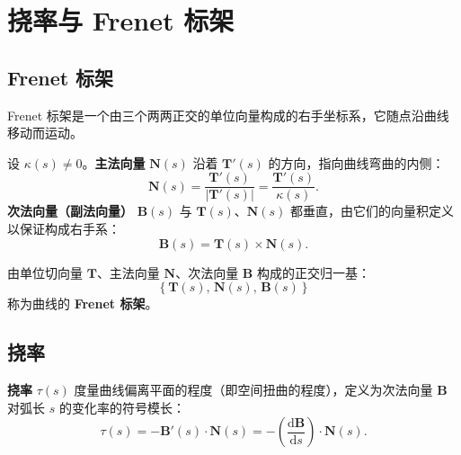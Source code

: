 \section{挠率与 Frenet 标架}

\subsection{Frenet 标架}

Frenet 标架是一个由三个两两正交的单位向量构成的右手坐标系，它随点沿曲线移动而运动。

\begin{definition}[主法向量与次法向量]
	设 $\kappa(s)\neq 0$。\textbf{主法向量} $\mathbf{N}(s)$ 沿着 $\mathbf{T}'(s)$ 的方向，指向曲线弯曲的内侧：
	\begin{equation}
		\mathbf{N}(s)=\frac{\mathbf{T}'(s)}{\left|\mathbf{T}'(s)\right|}
		=\frac{\mathbf{T}'(s)}{\kappa(s)}.
		\label{eq:主法向量:定义}
	\end{equation}
	\textbf{次法向量（副法向量）} $\mathbf{B}(s)$ 与 $\mathbf{T}(s)$、$\mathbf{N}(s)$ 都垂直，由它们的向量积定义以保证构成右手系：
	\begin{equation}
		\mathbf{B}(s)=\mathbf{T}(s)\times\mathbf{N}(s).
		\label{eq:次法向量:定义}
	\end{equation}
\end{definition}

\begin{definition}[Frenet 标架]
	由单位切向量 $\mathbf{T}$、主法向量 $\mathbf{N}$、次法向量 $\mathbf{B}$ 构成的正交归一基：
	\begin{equation}
		\left\{\mathbf{T}(s),\,\mathbf{N}(s),\,\mathbf{B}(s)\right\}
		\label{eq:Frenet标架:定义}
	\end{equation}
	称为曲线的 \textbf{Frenet 标架}。
\end{definition}

\subsection{挠率}

\begin{definition}[挠率]
	\textbf{挠率} $\tau(s)$ 度量曲线偏离平面的程度（即空间扭曲的程度），定义为次法向量 $\mathbf{B}$ 对弧长 $s$ 的变化率的符号模长：
	\begin{equation}
		\tau(s)=-\mathbf{B}'(s)\cdot\mathbf{N}(s)
		=-\left(\frac{\mathrm{d}\mathbf{B}}{\mathrm{d}s}\right)\cdot\mathbf{N}(s).
		\label{eq:挠率:定义}
	\end{equation}
\end{definition}

